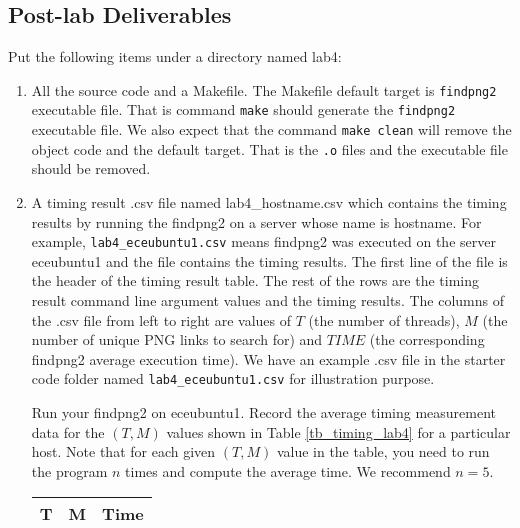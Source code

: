 \subsection{Post-lab Deliverables}
\label{sec:lab4:postlab}
Put the following items under a directory named lab4:
\begin{enumerate}
\item All the source code and a Makefile. The Makefile default target is \verb+findpng2+ executable file. That is command \verb+make+ should generate the \verb+findpng2+ executable file. We also expect that the command \verb+make clean+ will remove the object code and the default target. That is the \verb+.o+ files and the executable file should be removed.
\item A timing result .csv file named lab4\_hostname.csv 
  which contains the timing results by running the findpng2 on a server whose name is hostname. For example, \verb+lab4_eceubuntu1.csv+ means findpng2 was executed on the server eceubuntu1 and the file contains the timing results.
  The first line of the file is the header of the timing result table. The rest of the rows are the timing result command line argument values and the timing results. The columns of the .csv file from left to right are values of $T$ (the number of threads), $M$ (the number of unique PNG links to search for) and $TIME$ (the corresponding findpng2 average execution time). We have an example .csv file in the starter code folder named \verb+lab4_eceubuntu1.csv+ for illustration purpose.

  Run your findpng2 on eceubuntu1. Record the average timing measurement data for the $(T, M)$ values shown in Table \ref{tb_timing_lab4} for a particular host. Note that for each given $(T, M)$ value in the table, you need to run the program $n$ times and compute the average time. We recommend $n=5$.
\begin{table}[h]
\begin{center}
\begin{tabular}{|c|c|c|}
\hline
T     & M    & Time \\ \hline


\end{tabular}
\end{center}
\end{table}
\end{enumerate}
